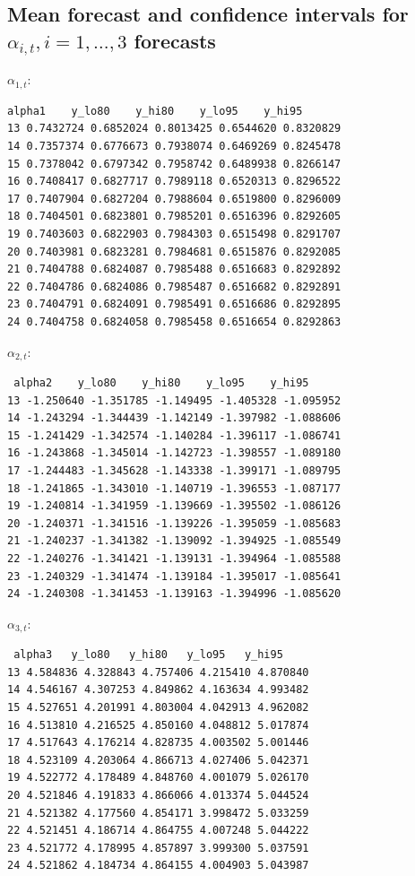\newpage

\nocite{dutang2015}
\nocite{wickham2016ggplot2}


\appendix

\subsection{Mean forecast and confidence intervals for $\alpha_{i, t}, i = 1, \ldots, 3$ forecasts}

$\alpha_{1, t}$:

\begin{verbatim}
alpha1    y_lo80    y_hi80    y_lo95    y_hi95
13 0.7432724 0.6852024 0.8013425 0.6544620 0.8320829
14 0.7357374 0.6776673 0.7938074 0.6469269 0.8245478
15 0.7378042 0.6797342 0.7958742 0.6489938 0.8266147
16 0.7408417 0.6827717 0.7989118 0.6520313 0.8296522
17 0.7407904 0.6827204 0.7988604 0.6519800 0.8296009
18 0.7404501 0.6823801 0.7985201 0.6516396 0.8292605
19 0.7403603 0.6822903 0.7984303 0.6515498 0.8291707
20 0.7403981 0.6823281 0.7984681 0.6515876 0.8292085
21 0.7404788 0.6824087 0.7985488 0.6516683 0.8292892
22 0.7404786 0.6824086 0.7985487 0.6516682 0.8292891
23 0.7404791 0.6824091 0.7985491 0.6516686 0.8292895
24 0.7404758 0.6824058 0.7985458 0.6516654 0.8292863
\end{verbatim}

$\alpha_{2, t}$:

\begin{verbatim}
 alpha2    y_lo80    y_hi80    y_lo95    y_hi95
13 -1.250640 -1.351785 -1.149495 -1.405328 -1.095952
14 -1.243294 -1.344439 -1.142149 -1.397982 -1.088606
15 -1.241429 -1.342574 -1.140284 -1.396117 -1.086741
16 -1.243868 -1.345014 -1.142723 -1.398557 -1.089180
17 -1.244483 -1.345628 -1.143338 -1.399171 -1.089795
18 -1.241865 -1.343010 -1.140719 -1.396553 -1.087177
19 -1.240814 -1.341959 -1.139669 -1.395502 -1.086126
20 -1.240371 -1.341516 -1.139226 -1.395059 -1.085683
21 -1.240237 -1.341382 -1.139092 -1.394925 -1.085549
22 -1.240276 -1.341421 -1.139131 -1.394964 -1.085588
23 -1.240329 -1.341474 -1.139184 -1.395017 -1.085641
24 -1.240308 -1.341453 -1.139163 -1.394996 -1.085620
\end{verbatim}

$\alpha_{3, t}$:

\begin{verbatim}
 alpha3   y_lo80   y_hi80   y_lo95   y_hi95
13 4.584836 4.328843 4.757406 4.215410 4.870840
14 4.546167 4.307253 4.849862 4.163634 4.993482
15 4.527651 4.201991 4.803004 4.042913 4.962082
16 4.513810 4.216525 4.850160 4.048812 5.017874
17 4.517643 4.176214 4.828735 4.003502 5.001446
18 4.523109 4.203064 4.866713 4.027406 5.042371
19 4.522772 4.178489 4.848760 4.001079 5.026170
20 4.521846 4.191833 4.866066 4.013374 5.044524
21 4.521382 4.177560 4.854171 3.998472 5.033259
22 4.521451 4.186714 4.864755 4.007248 5.044222
23 4.521772 4.178995 4.857897 3.999300 5.037591
24 4.521862 4.184734 4.864155 4.004903 5.043987
\end{verbatim}

